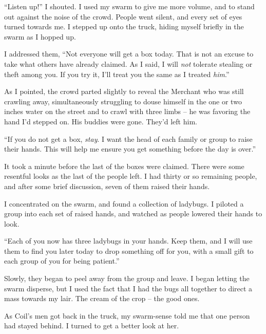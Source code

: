 ``Listen up!'' I shouted.  I used my swarm to give me more volume, and to stand out against the noise of the crowd.  People went silent, and every set of eyes turned towards me.  I stepped up onto the truck, hiding myself briefly in the swarm as I hopped up.



I addressed them, ``Not everyone will get a box today.  That is not an excuse to take what others have already claimed.  As I said, I will \emph{not} tolerate stealing or theft among you.  If you try it, I'll treat you the same as I treated \emph{him}.''



As I pointed, the crowd parted slightly to reveal the Merchant who was still crawling away, simultaneously struggling to douse himself in the one or two inches water on the street and to crawl with three limbs – he was favoring the hand I'd stepped on.  His buddies were gone.  They'd left him.



``If you do not get a box, \emph{stay}.  I want the head of each family or group to raise their hands.  This will help me ensure you get something before the day is over.''



It took a minute before the last of the boxes were claimed.  There were some resentful looks as the last of the people left.  I had thirty or so remaining people, and after some brief discussion, seven of them raised their hands.



I concentrated on the swarm, and found a collection of ladybugs.  I piloted a group into each set of raised hands, and watched as people lowered their hands to look.



``Each of you now has three ladybugs in your hands.  Keep them, and I will use them to find you later today to drop something off for you, with a small gift to each group of you for being patient.''



Slowly, they began to peel away from the group and leave.  I began letting the swarm disperse, but I used the fact that I had the bugs all together to direct a mass towards my lair.  The cream of the crop – the good ones.



As Coil's men got back in the truck, my swarm-sense told me that one person had stayed behind.  I turned to get a better look at her.



